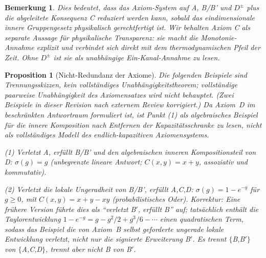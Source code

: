 \documentclass[aps,prd,twocolumn,superscriptaddress,nofootinbib]{revtex4-2}
\newtheorem{proposition}{Proposition}
\newtheorem{remark}{Bemerkung}
\begin{document}
\begin{remark}
Dies bedeutet, dass das Axiom-System auf A, B/B' und $D^\pm$ plus die abgeleitete Konsequenz C reduziert werden kann, sobald das eindimensionale innere Gruppengesetz physikalisch gerechtfertigt ist. Wir behalten Axiom C als separate Aussage für physikalische Transparenz: sie macht die Monotonie-Annahme explizit und verbindet sich direkt mit dem thermodynamischen Pfeil der Zeit. Ohne $D^\pm$ ist sie als unabhängige Ein-Kanal-Annahme zu lesen.
\end{remark}

\begin{proposition}[Nicht-Redundanz der Axiome]
\label{prop:independence}
Die folgenden Beispiele sind \emph{Trennungsskizzen}, kein vollständiges Unabhängigkeitstheorem; vollständige paarweise Unabhängigkeit des Axiomensatzes wird nicht behauptet. \emph{(Zwei Beispiele in dieser Revision nach externem Review korrigiert.)} Da Axiom~D im beschränkten Antwortraum formuliert ist, ist Punkt (1) als algebraisches Beispiel für die innere Komposition nach Entfernen der Kapazitätsschranke zu lesen, nicht als vollständiges Modell des endlich-kapazitiven Axiomensystems.

\textit{(1) Verletzt A, erfüllt B/B' und den algebraischen inneren Kompositionsteil von D:} $\sigma(g) = g$ (unbegrenzte lineare Antwort; $C(x,y) = x+y$, assoziativ und kommutativ).

\textit{(2) Verletzt die lokale Ungeradheit von B/B', erfüllt A,C,D:} $\sigma(g) = 1 - e^{-g}$ für $g \geq 0$, mit $C(x,y) = x + y - xy$ (probabilistisches Oder). \emph{Korrektur:} Eine frühere Version führte dies als ``verletzt B$'$, erfüllt B'' auf; tatsächlich enthält die Taylorentwicklung $1-e^{-g} = g - g^2/2 + g^3/6 - \cdots$ einen quadratischen Term, sodass das Beispiel die von Axiom~B selbst geforderte ungerade lokale Entwicklung verletzt, nicht nur die signierte Erweiterung B$'$. Es trennt $\{$B,B$'\}$ von $\{$A,C,D$\}$, trennt aber nicht B von B$'$.


\end{proposition}
\end{document}
